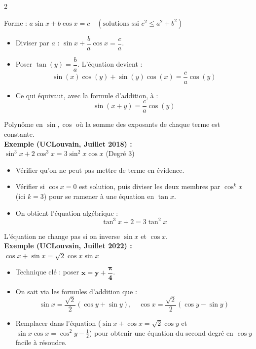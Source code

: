 {\begin{multicols}{2}
\vspace{6pt}

\vspace{2pt}
\noindent Forme : $a\sin x + b\cos x = c \quad (\text{solutions ssi } c^2 \le a^2+b^2)$
\begin{itemize}[leftmargin=1.2em, itemsep=2pt, topsep=2pt]
    \item Diviser par $a$ : $\sin x + \dfrac{b}{a}\cos x = \dfrac{c}{a}$.
    \item Poser $\tan(y) = \dfrac{b}{a}$. L'équation devient :
    \[
        \sin(x)\cos(y) + \sin(y)\cos(x) = \frac{c}{a}\cos(y)
    \]
    \item Ce qui équivaut, avec la formule d'addition, à :
    \[
        \sin(x+y) = \frac{c}{a}\cos(y)
    \]
\end{itemize}

\columnbreak


\vspace{2pt}
\noindent Polynôme en $\sin, \cos$ où la somme des exposants de chaque terme est constante.\\
\textbf{Exemple (UCLouvain, Juillet 2018) :}\\
$\sin^3 x + 2\cos^3 x = 3\sin^2 x \cos x$ (Degré 3)
\begin{itemize}[leftmargin=1.2em, itemsep=2pt, topsep=2pt]
    \item Vérifier qu'on ne peut pas mettre de terme en évidence.
    \item Vérifier si $\cos x = 0$ est solution, puis diviser les deux membres par $\cos^k x$ (ici $k=3$) pour se ramener à une équation en $\tan x$.
    \item On obtient l'équation algébrique :
    \[
        \tan^3 x + 2 = 3\tan^2 x
    \]
\end{itemize}

\vspace{6pt}

\vspace{2pt}
\noindent L'équation ne change pas si on inverse $\sin x$ et $\cos x$.\\
\textbf{Exemple (UCLouvain, Juillet 2022) :}\\
$\cos x + \sin x = \sqrt{2}\cos x \sin x$
\begin{itemize}[leftmargin=1.2em, itemsep=2pt, topsep=2pt]
    \item Technique clé : poser $\mathbf{x = y + \dfrac{\pi}{4}}$.
    \item On sait via les formules d'addition que :
    \[
        \sin x = \frac{\sqrt{2}}{2}(\cos y + \sin y), \quad \cos x = \frac{\sqrt{2}}{2}(\cos y - \sin y)
    \]
    \item Remplacer dans l'équation ($\sin x + \cos x = \sqrt{2}\cos y$ et $\sin x\cos x = \cos^2 y - \frac{1}{2}$) pour obtenir une équation du second degré en $\cos y$ facile à résoudre.
\end{itemize}


\end{multicols}}
